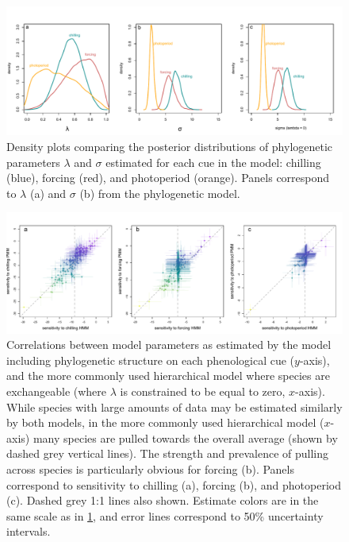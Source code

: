 \documentclass[11pt]{article}
\begin{document}
\begin{figure} 
  \begin{center}
  \includegraphics[width=14cm]{../../analyses/phylogeny/figures/Fig2_lambdas_sigmas.pdf}
  \caption{Density plots comparing the posterior distributions of phylogenetic parameters $\lambda$ and $\sigma$ estimated for each cue in the model: chilling (blue), forcing (red), and photoperiod (orange). Panels correspond to $\lambda$ (a) and $\sigma$ (b) from the phylogenetic model.}
  \label{fig:phylosig_all}
  \end{center}
\end{figure}

\begin{figure} 
  \begin{center}
  \includegraphics[width=14cm]{../../analyses/phylogeny/figures/Fig3_correlations_lambestvslamb0_cols.pdf}
  \caption{Correlations between model parameters as estimated by the model including phylogenetic structure on each phenological cue ($y$-axis), and the more commonly used hierarchical model where species are exchangeable (where $\lambda$ is constrained to be equal to zero, $x$-axis). While species with large amounts of data may be estimated similarly by both models, in the more commonly used hierarchical model ($x$-axis) many species are pulled towards the overall average (shown by dashed grey vertical lines). The strength and prevalence of pulling across species is particularly obvious for forcing (b). Panels correspond to sensitivity to chilling (a), forcing (b), and photoperiod (c). Dashed grey 1:1 lines also shown. Estimate colors are in the same scale as in \ref{fig:phylosig_all}, and error lines correspond to 50\% uncertainty intervals.}
  \label{fig:correls_angio}
  \end{center}
\end{figure}
\end{document}
